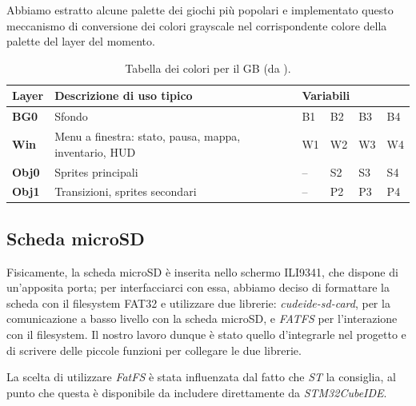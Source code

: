 \documentclass[hidelinks,12pt]{article}
\begin{document}
Abbiamo estratto alcune palette dei giochi più popolari e implementato questo
meccanismo di conversione dei colori grayscale nel corrispondente colore della
palette del layer del momento.

\begin{table}[h]
	\begin{tabular}{|l|l|llll|}
		\hline
		\textbf{Layer} & \textbf{Descrizione di uso tipico}                    & \multicolumn{4}{l|}{\textbf{Variabili}}                                                          \\ \hline
		\textbf{BG0}   & Sfondo                                                & \multicolumn{1}{l|}{B1}                 & \multicolumn{1}{l|}{B2} & \multicolumn{1}{l|}{B3} & B4 \\ \hline
		\textbf{Win}   & Menu a finestra: stato, pausa, mappa, inventario, HUD & \multicolumn{1}{l|}{W1}                 & \multicolumn{1}{l|}{W2} & \multicolumn{1}{l|}{W3} & W4 \\ \hline
		\textbf{Obj0}  & Sprites principali                                    & \multicolumn{1}{l|}{–}                  & \multicolumn{1}{l|}{S2} & \multicolumn{1}{l|}{S3} & S4 \\ \hline
		\textbf{Obj1}  & Transizioni, sprites secondari                        & \multicolumn{1}{l|}{–}                  & \multicolumn{1}{l|}{P2} & \multicolumn{1}{l|}{P3} & P4 \\ \hline
	\end{tabular}
	\caption{Tabella dei colori per il GB (da
		\cite{GameBoyColors}).}
	\label{table:gb_colors}
\end{table}

\subsection{Scheda microSD}
Fisicamente, la scheda microSD è inserita nello schermo ILI9341, che dispone di
un'apposita porta; per interfacciarci con essa, abbiamo deciso di formattare la
scheda con il filesystem FAT32 e utilizzare due librerie:
\textit{cudeide-sd-card}, per la comunicazione a basso livello con la scheda
microSD, e \textit{FATFS} per l'interazione con il filesystem.
Il nostro lavoro dunque è stato quello d'integrarle nel progetto e di scrivere
delle piccole funzioni per collegare le due librerie.

La scelta di utilizzare \textit{FatFS} è stata influenzata dal fatto che
\textit{ST} la consiglia, al punto che questa è disponibile da includere
direttamente da \textit{STM32CubeIDE}. 
\end{document}
